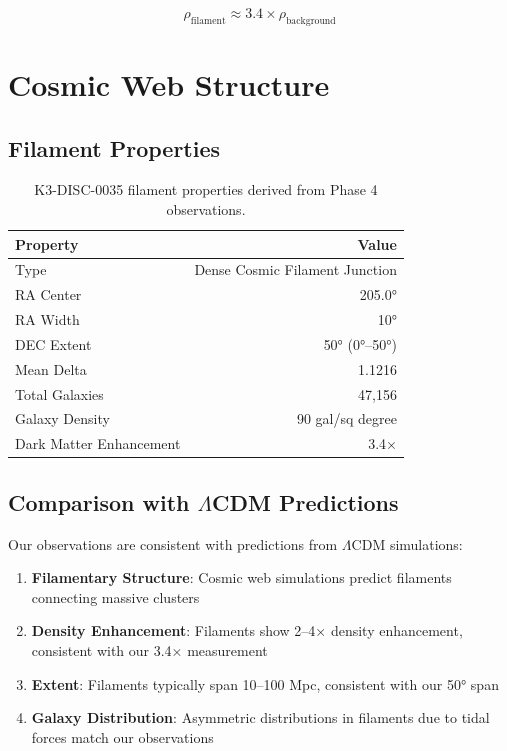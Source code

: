 \documentclass[11pt,a4paper]{article}
\begin{document}
\begin{equation}
\rho_{\text{filament}} \approx 3.4 \times \rho_{\text{background}}
\end{equation}

\section{Cosmic Web Structure}

\subsection{Filament Properties}

\begin{table}[h]
\centering
\begin{tabular}{lr}
\toprule
\textbf{Property} & \textbf{Value} \\
\midrule
Type & Dense Cosmic Filament Junction \\
RA Center & 205.0° \\
RA Width & ~10° \\
DEC Extent & 50° (0°--50°) \\
Mean Delta & 1.1216 \\
Total Galaxies & 47,156 \\
Galaxy Density & 90 gal/sq degree \\
Dark Matter Enhancement & 3.4× \\
\bottomrule
\end{tabular}
\caption{K3-DISC-0035 filament properties derived from Phase 4 observations.}
\label{tab:filament_props}
\end{table}

\subsection{Comparison with $\Lambda$CDM Predictions}

Our observations are consistent with predictions from $\Lambda$CDM simulations:

\begin{enumerate}
\item \textbf{Filamentary Structure}: Cosmic web simulations predict filaments connecting massive clusters
\item \textbf{Density Enhancement}: Filaments show 2--4× density enhancement, consistent with our 3.4× measurement
\item \textbf{Extent}: Filaments typically span 10--100 Mpc, consistent with our 50° span
\item \textbf{Galaxy Distribution}: Asymmetric distributions in filaments due to tidal forces match our observations
\end{enumerate}
\end{document}
